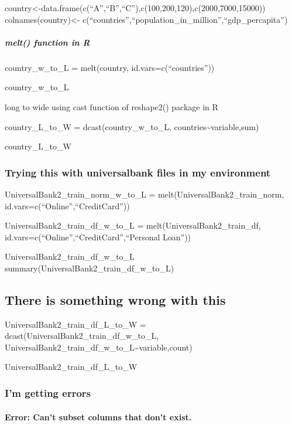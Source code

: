 \documentclass[
]{article}
\begin{document}
country\textless-data.frame(c(``A'',``B'',``C''),c(100,200,120),c(2000,7000,15000))
colnames(country)\textless-
c(``countries'',``population\_in\_million'',``gdp\_percapita'')

\hypertarget{melt-function-in-r}{%
\subparagraph{melt() function in R}\label{melt-function-in-r}}

country\_w\_to\_L = melt(country, id.vars=c(``countries''))

country\_w\_to\_L

long to wide using cast function of reshape2() package in R

country\_L\_to\_W = dcast(country\_w\_to\_L,
countries\textasciitilde variable,sum)

country\_L\_to\_W

\hypertarget{trying-this-with-universalbank-files-in-my-environment}{%
\subsubsection{Trying this with universalbank files in my
environment}\label{trying-this-with-universalbank-files-in-my-environment}}

UniversalBank2\_train\_norm\_w\_to\_L =
melt(UniversalBank2\_train\_norm, id.vars=c(``Online'',``CreditCard''))

UniversalBank2\_train\_df\_w\_to\_L = melt(UniversalBank2\_train\_df,
id.vars=c(``Online'',``CreditCard'',``Personal Loan''))

UniversalBank2\_train\_df\_w\_to\_L
summary(UniversalBank2\_train\_df\_w\_to\_L)

\hypertarget{there-is-something-wrong-with-this}{%
\subsection{There is something wrong with
this}\label{there-is-something-wrong-with-this}}

UniversalBank2\_train\_df\_L\_to\_W =
dcast(UniversalBank2\_train\_df\_w\_to\_L,
UniversalBank2\_train\_df\_w\_to\_L\textasciitilde variable,count)

UniversalBank2\_train\_df\_L\_to\_W

\hypertarget{im-getting-errors}{%
\subsubsection{I'm getting errors}\label{im-getting-errors}}

\hypertarget{error-cant-subset-columns-that-dont-exist.}{%
\paragraph{Error: Can't subset columns that don't
exist.}\label{error-cant-subset-columns-that-dont-exist.}}
\end{document}
